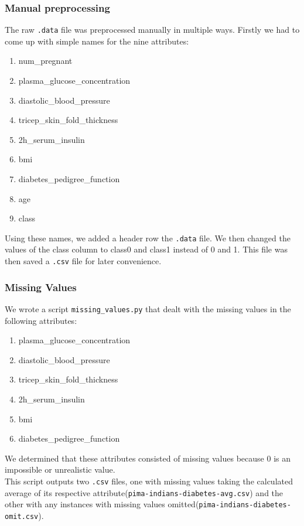 \documentclass{article}
\renewcommand{\tt}{\texttt}
\begin{document}
\subsubsection{Manual preprocessing}
The raw \tt{.data} file was preprocessed manually in multiple ways. Firstly we had to come up with simple names for the nine attributes:
\begin{enumerate}[1.]
\item num\_pregnant
\item plasma\_glucose\_concentration
\item diastolic\_blood\_pressure
\item tricep\_skin\_fold\_thickness
\item 2h\_serum\_insulin
\item bmi
\item diabetes\_pedigree\_function
\item age
\item class
\end{enumerate}
Using these names, we added a header row the \tt{.data} file. We then changed the values of the class column to class0 and class1 instead of 0 and 1. This file was then saved a \tt{.csv} file for later convenience.

\subsubsection{Missing Values}
We wrote a script \tt{missing\_values.py} that dealt with the missing values in the following attributes:
\begin{enumerate}[1.]
\item plasma\_glucose\_concentration
\item diastolic\_blood\_pressure
\item tricep\_skin\_fold\_thickness
\item 2h\_serum\_insulin
\item bmi
\item diabetes\_pedigree\_function
\end{enumerate} 

We determined that these attributes consisted of missing values because 0 is an impossible or unrealistic value.\\

This script outputs two \tt{.csv} files, one with missing values taking the calculated average of its respective attribute(\tt{pima-indians-diabetes-avg.csv}) and the other with any instances with missing values omitted(\tt{pima-indians-diabetes-omit.csv}).\\
\end{document}
